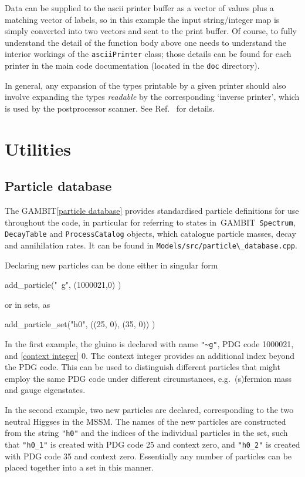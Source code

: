 \documentclass[pdftex,twocolumn,epjc3_preprint,runningheads]{svjour3}
\renewcommand{\_}{\discretionary{\underscore}{}{\underscore}}
\newcommand\cpp[1]{{\lstinline!#1!}}  %
\newcommand\term[1]{{\lstset{style=terminal}\lstinline!#1!\lstset{style=cpp}}}
\newcommand{\cross}[1]{\ref{#1}}
\newcommand{\gambit}{\textsf{GAMBIT}\xspace}
\newcommand{\GB}{\gambit}
\begin{document}
Data can be supplied to the \textsf{ascii} printer buffer as a vector of values plus a matching vector of labels, so in this example the input string/integer map is simply converted into two vectors and sent to the print buffer. Of course, to fully understand the detail of the function body above one needs to understand the interior workings of the \cpp{asciiPrinter} class; those details can be found for each printer in the main code documentation (located in the \term{doc} directory).

In general, any expansion of the types printable by a given printer should also involve expanding the types \textit{readable} by the corresponding `inverse printer', which is used by the \textsf{postprocessor} scanner.  See Ref.\ \cite{ScannerBit} for details.

\section{Utilities}
\label{utils}

\subsection{Particle database}
\label{pdb}

The \GB \cross{particle database} provides standardised particle definitions for use throughout the code, in particular for referring to states in\ \GB\ \cpp{Spectrum}, \cpp{DecayTable} and \cpp{ProcessCatalog} objects, which catalogue particle masses, decay and annihilation rates.  It can be found in \term{Models/src/particle\_database.cpp}.

Declaring new particles can be done either in singular form
\begin{lstcpp}
add_particle("~g", (1000021,0) )
\end{lstcpp}
or in sets, as
\begin{lstcpp}
add_particle_set("h0", ((25, 0), (35, 0)) )
\end{lstcpp}
In the first example, the gluino is declared with name \mbox{\lstinline{"~g"}}, PDG code 1000021, and \cross{context integer} 0.  The context integer provides an additional index beyond the PDG code.  This can be used to distinguish different particles that might employ the same PDG code under different circumstances, e.g.\ (s)fermion mass and gauge eigenstates.

In the second example, two new particles are declared, corresponding to the two neutral Higgses in the MSSM.  The names of the new particles are constructed from the string \lstinline{"h0"} and the indices of the individual particles in the set, such that \lstinline{"h0_1"} is created with PDG code 25 and context zero, and \lstinline{"h0_2"} is created with PDG code 35 and context zero.  Essentially any number of particles can be placed together into a set in this manner.
\end{document}
